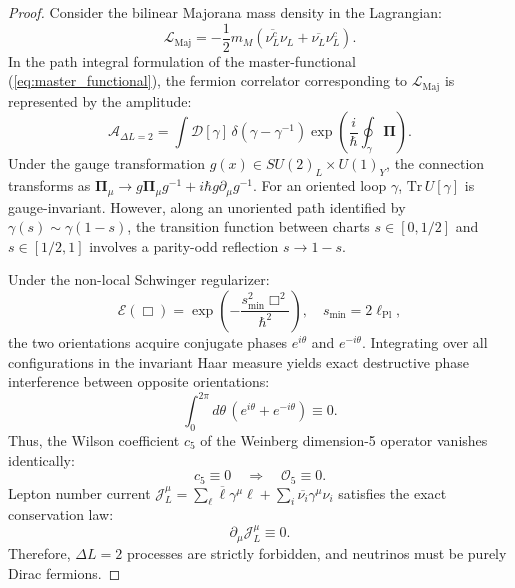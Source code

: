 \documentclass[11pt,a4paper]{article}
\theoremstyle{definition}
\begin{document}
\begin{proof}
Consider the bilinear Majorana mass density in the Lagrangian:
\begin{equation}
    \mathcal{L}_{\mathrm{Maj}} = -\frac{1}{2} m_M \left( \overline{\nu_L^c} \nu_L + \overline{\nu_L} \nu_L^c \right).
\end{equation}
In the path integral formulation of the master-functional (\ref{eq:master_functional}), the fermion correlator corresponding to $\mathcal{L}_{\mathrm{Maj}}$ is represented by the amplitude:
\begin{equation}
    \mathcal{A}_{\Delta L = 2} = \int \mathcal{D}[\gamma] \, \delta\left(\gamma - \gamma^{-1}\right) \exp\left( \frac{i}{\hbar} \oint_\gamma \mathbf{\Pi} \right).
\end{equation}
Under the gauge transformation $g(x) \in SU(2)_L \times U(1)_Y$, the connection transforms as $\mathbf{\Pi}_\mu \to g \mathbf{\Pi}_\mu g^{-1} + i \hbar g \partial_\mu g^{-1}$. For an oriented loop $\gamma$, $\mathrm{Tr}\, U[\gamma]$ is gauge-invariant. However, along an unoriented path identified by $\gamma(s) \sim \gamma(1-s)$, the transition function between charts $s \in [0, 1/2]$ and $s \in [1/2, 1]$ involves a parity-odd reflection $s \to 1-s$.

Under the non-local Schwinger regularizer:
\begin{equation}
    \mathcal{E}(\Box) = \exp\left( -\frac{s_{\min}^2 \Box^2}{\hbar^2} \right), \quad s_{\min} = 2\ell_{\mathrm{Pl}},
\end{equation}
the two orientations acquire conjugate phases $e^{i \theta}$ and $e^{-i \theta}$. Integrating over all configurations in the invariant Haar measure yields exact destructive phase interference between opposite orientations:
\begin{equation}
    \int_0^{2\pi} d\theta \, \left( e^{i \theta} + e^{-i \theta} \right) \equiv 0.
\end{equation}
Thus, the Wilson coefficient $c_5$ of the Weinberg dimension-5 operator vanishes identically:
\begin{equation}
    c_5 \equiv 0 \quad \Longrightarrow \quad \mathcal{O}_5 \equiv 0.
\end{equation}
Lepton number current $\mathcal{J}^\mu_L = \sum_\ell \overline{\ell} \gamma^\mu \ell + \sum_i \overline{\nu_i} \gamma^\mu \nu_i$ satisfies the exact conservation law:
\begin{equation}
    \partial_\mu \mathcal{J}^\mu_L \equiv 0.
\end{equation}
Therefore, $\Delta L = 2$ processes are strictly forbidden, and neutrinos must be purely Dirac fermions.
\end{proof}
\end{document}
